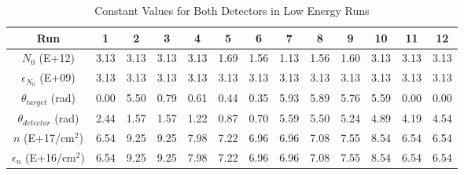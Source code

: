 \documentclass[10pt]{IEEEtran}
\begin{document}
\begin{table}[!hbt]
        \begin{center}
        \caption{Constant Values for Both Detectors in Low Energy Runs}
        \label{tab:lowconst}
        \begin{tabular}{|c|cccccccccccc|}
            \hline
		   Run & 1 & 2 & 3 & 4 & 5 & 6 & 7 & 8 & 9 & 10 & 11 & 12 \\ 
            \hline\hline
            $N_0$ (E+12) & 3.13 & 3.13 & 3.13 & 3.13 & 1.69 & 1.56 & 1.13 & 1.56 & 1.60 & 3.13 & 3.13 & 3.13 \\
		   \hline            
            $\epsilon_{N_{0}}$ (E+09) & 3.13 & 3.13 & 3.13 & 3.13 & 3.13 & 3.13 & 3.13 & 3.13 & 3.13 & 3.13 & 3.13 & 3.13 \\ 
            \hline
            $\theta_{target}$ (rad)& 0.00 & 5.50 & 0.79 & 0.61 & 0.44 & 0.35 & 5.93 & 5.89 & 5.76 & 5.59 & 0.00 & 0.00 \\
            \hline
            $\theta_{detector}$ (rad)& 2.44 & 1.57 & 1.57 & 1.22 & 0.87 & 0.70 & 5.59 & 5.50 & 5.24 & 4.89 & 4.19 & 4.54 \\
            \hline
            $n$  (E+17/cm$^2$) & 6.54 & 9.25 & 9.25 & 7.98 & 7.22 & 6.96 & 6.96 & 7.08 & 7.55 & 8.54 & 6.54 & 6.54 \\
            \hline
            $\epsilon_n$  (E+16/cm$^2$) & 6.54 & 9.25 & 9.25 & 7.98 & 7.22 & 6.96 & 6.96 & 7.08 & 7.55 & 8.54 & 6.54 & 6.54 \\
            \hline
        \end{tabular}
        \end{center}
    \end{table}
    
\end{document}
